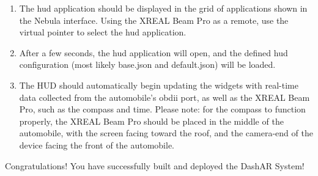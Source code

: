 \begin{enumerate}
        \item The \gls{hud} application should be displayed in the grid of applications shown in the Nebula interface. Using the XREAL Beam Pro as a remote, use the virtual pointer to select the \gls{hud} application.
        \item After a few seconds, the \gls{hud} application will open, and the defined \gls{hud} configuration (most likely base.json and default.json) will be loaded.
        \item The HUD should automatically begin updating the widgets with real-time data collected from the automobile's \gls{obdii} port, as well as the XREAL Beam Pro, such as the compass and time. Please note: for the compass to function properly, the XREAL Beam Pro should be placed in the middle of the automobile, with the screen facing toward the roof, and the camera-end of the device facing the front of the automobile.
    \end{enumerate}

    \par Congratulations! You have successfully built and deployed the DashAR System!